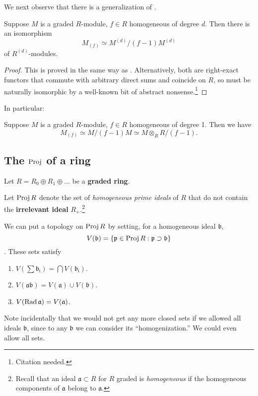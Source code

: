 We next observe that there is a generalization of .
\begin{proposition} \label{loc
module as quotient}
Suppose $M$ is a graded $R$-module, $f \in R$ homogeneous of degree $d$. Then
there is  an isomorphism
\[ M_{(f)} \simeq M^{(d)}/(f-1)M^{(d)}  \]
of $R^{(d)}$-modules.
\end{proposition}
\begin{proof} 
This is proved in the same way as . Alternatively, both are right-exact functors that commute with
arbitrary direct sums and coincide on $R$, so must be naturally isomorphic by
a well-known bit of abstract nonsense.\footnote{Citation needed.} 
\end{proof} 

In particular:
\begin{corollary} 
Suppose $M$ is a graded $R$-module, $f \in R$ homogeneous of degree 1. Then we
have
\[  M_{(f)} \simeq M/(f-1)M \simeq M\otimes_R R/(f-1).  \]
\end{corollary} 

\subsection{The $\operatorname{Proj}$ of a ring}
Let $R=R_0 \oplus R_1 \oplus \dots$ be a \textbf{graded ring}.

\begin{definition} 
Let $\operatorname{Proj} R$ denote the set of \emph{homogeneous prime ideals} of
$R$ that do not contain the \textbf{irrelevant ideal} $R_+$.\footnote{Recall
that an ideal $\mathfrak{a} \subset R$ for $R$ graded is
\emph{homogeneous} if the homogeneous components of $\mathfrak{a}$ belong to
$\mathfrak{a}$.}

\end{definition} 

We can put a topology on $\operatorname{Proj} R$ by setting, for a homogeneous ideal
$\mathfrak{b}$, $$V(\mathfrak{b}) = \{ \mathfrak{p} \in \operatorname{Proj} R:
\mathfrak{p} \supset \mathfrak{b}\}$$.  These sets satisfy
\begin{enumerate}
\item $V( \sum \mathfrak{b_i}) = \bigcap V(\mathfrak{b_i})$.
\item  $V( \mathfrak{a}\mathfrak{b}) = V(\mathfrak{a}) \cup V(\mathfrak{b})$.
\item  $V( \operatorname{Rad} \mathfrak{a}) = V(\mathfrak{a})$.
\end{enumerate}
Note incidentally that we would not get any more closed sets if we allowed all
ideals $\mathfrak{b}$, since to any $\mathfrak{b}$ we can consider its
``homogenization.''
We could even allow all sets.

